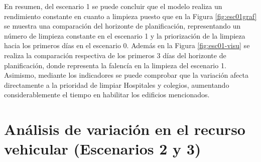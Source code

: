 \documentclass[letterpaper,conference]{IEEEtran}
\begin{document}
En resumen, del escenario 1 se puede concluir que el modelo realiza un rendimiento constante en cuanto a limpieza puesto que en la Figura \ref{fig:esc01graf} se muestra una comparación del horizonte de planificación, representando un número de limpieza constante en el escenario 1 y la priorización de la limpieza hacia los primeros días en el escenario 0. Además en la Figura \ref{fig:esc01-visu} se realiza la comparación respectiva de los primeros 3 días del horizonte de planificación, donde representa la falencía en la limpieza del escenario 1. Asimismo, mediante los indicadores se puede comprobar que la variación afecta directamente a la prioridad de limpiar Hospitales y colegios, aumentando considerablemente el tiempo en habilitar los edificios mencionados.




\section{Análisis de variación en el recurso vehicular (Escenarios 2 y 3)}
\end{document}
